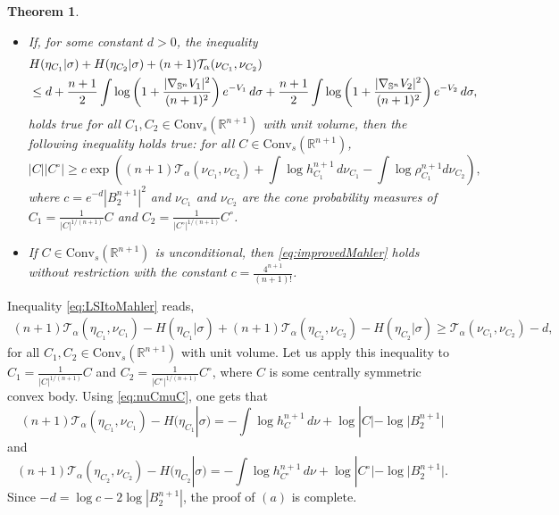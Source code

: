 \documentclass[10pt]{amsart}
\newtheorem{thm}{Theorem}[section]
\theoremstyle{definition}
\theoremstyle{remark}
\newcommand{\R}{\mathbb{R}}
\newcommand{\Sd}{\mathbb{S}}
\begin{document}
\begin{thm}\label{thm:LSItoMahler}\
\begin{itemize}
\item[(a)]If, for some constant $d>0$, the inequality
\begin{align}\label{eq:LSItoMahler}
\notag &H(\eta_{C_1} | \sigma)+ H(\eta_{C_2} | \sigma) + (n+1)\mathcal{T}_\alpha(\nu_{C_1},\nu_{C_2})\\
&\leq d + \frac{n+1}{2}\int \log\left(1+ \frac{|\nabla_{\Sd^n}V_1|^2}{(n+1)^2} \right)e^{-V_{1}}\,d\sigma 
+ \frac{n+1}{2}\int \log\left(1+ \frac{|\nabla_{\Sd^n}V_2|^2}{(n+1)^2} \right)e^{-V_{2}}\,d\sigma,
\end{align}
holds true for all $C_1,C_2 \in \mathrm{Conv}_s(\R^{n+1})$ with unit volume, then the following inequality holds true: for all $C \in \mathrm{Conv}_{s}(\R^{n+1})$,
\begin{equation}\label{eq:improvedMahler}
|C||C^\circ| \geq c \exp\left((n+1) \mathcal{T}_\alpha(\nu_{C_1},\nu_{C_2})+ \int \log h_{C_1}^{n+1}\,d\nu_{C_1} - \int \log \rho_{C_1}^{n+1}d\nu_{C_2}\right),
\end{equation}
where $c=e^{-d}|B_2^{n+1}|^2$ and $\nu_{C_1}$ and $\nu_{C_2}$ are the cone probability measures of $C_1=\frac{1}{|C|^{1/(n+1)}}C$ and $C_2=\frac{1}{|C^\circ|^{1/(n+1)}}C^\circ$.
\item[(b)]If $C \in \mathrm{Conv}_s(\R^{n+1})$ is unconditional, then \eqref{eq:improvedMahler} holds without restriction with the constant $c= \frac{4^{n+1}}{(n+1)!}$.
\end{itemize}
\end{thm}


\proof
Inequality \eqref{eq:LSItoMahler} reads,
\begin{multline*}
(n+1)\mathcal{T}_\alpha(\eta_{C_1},\nu_{C_1}) - H(\eta_{C_1}|\sigma) + (n+1)\mathcal{T}_\alpha(\eta_{C_2},\nu_{C_2}) - H(\eta_{C_2}|\sigma)
\geq \mathcal{T}_\alpha(\nu_{C_1},\nu_{C_2})-d,
\end{multline*}
for all $C_1,C_2 \in \mathrm{Conv}_s(\R^{n+1})$ with unit volume.
Let us apply this inequality to $C_1=\frac{1}{|C|^{1/(n+1)}}C$ and $C_2=\frac{1}{|C^\circ|^{1/(n+1)}}C^\circ$, where $C$ is some centrally symmetric convex body. Using \eqref{eq:nuCmuC}, one gets that
\[
(n+1)\mathcal{T}_\alpha(\eta_{C_1},\nu_{C_1}) - H(\eta_{C_1}|\sigma) = -\int \log h_{C}^{n+1}\,d\nu + \log |C| - \log |B_2^{n+1}|
\]
and 
\[
(n+1)\mathcal{T}_\alpha(\eta_{C_2},\nu_{C_2}) - H(\eta_{C_2}|\sigma) = -\int \log h_{C^\circ}^{n+1}\,d\nu + \log |C^\circ| - \log |B_2^{n+1}|.
\]
Since $-d = \log c - 2 \log |B_2^{n+1}|$, the proof of $(a)$ is complete.
\end{document}
